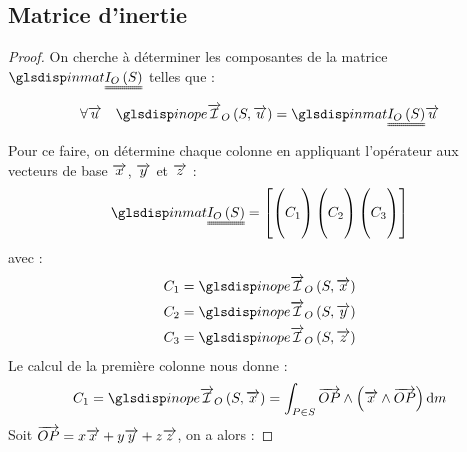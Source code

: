 	\subsection{Matrice d'inertie}
	\begin{theorem}
	\end{theorem}
	\begin{proof}
		On cherche à déterminer les composantes de la matrice $\inmat{S}$ telles que :
		\begin{equation*}
			\forall\vect{u}	\quad \inope{S}{\vect{u}}=\inmat{S}\vect{u}
		\end{equation*}
		Pour ce faire, on détermine chaque colonne en appliquant l'opérateur aux vecteurs de base $\overrightarrow{x}$, $\overrightarrow{y}$ et $\overrightarrow{z}$ :
		\begin{equation*}
			\inmat{S}=
				\left[
					\begin{pmatrix}
						 ~\\
						C_1\\
						 ~ 
					\end{pmatrix}
					\begin{pmatrix}
						 ~\\
						C_2\\
						 ~ 
					\end{pmatrix}
					\begin{pmatrix}
						 ~\\
						C_3\\
						 ~ 
					\end{pmatrix}					
				\right]
		\end{equation*}
		avec :
		\begin{subequations}
			\begin{align}
				C_1=\inope{S}{\vect{x}}\\				
				C_2=\inope{S}{\vect{y}}\\				
				C_3=\inope{S}{\vect{z}}			
			\end{align}
		\end{subequations}
		Le calcul de la première colonne nous donne :
		\begin{equation*}
			C_1=\inope{S}{\vect{x}}=\ints{\vect{OP}\wedge\left(\vect{x}\wedge\vect{OP}\right)}
		\end{equation*}
		Soit $\overrightarrow{OP}=x\overrightarrow{x}+y\overrightarrow{y}+z\overrightarrow{z}$, on a alors :

\end{proof}
